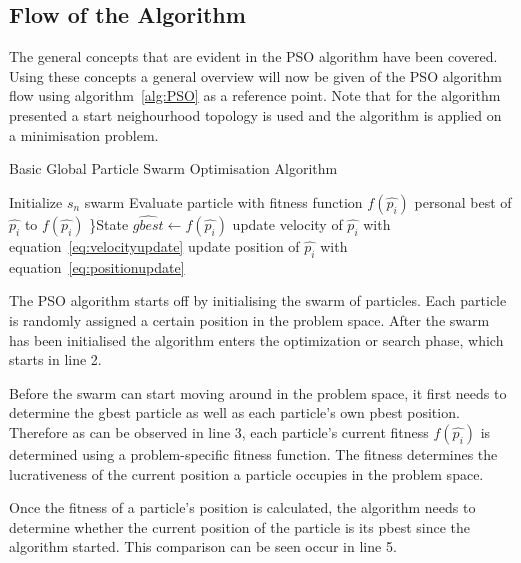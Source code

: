 \subsection{Flow of the Algorithm}
The general concepts that are evident in the \gls{PSO} algorithm have been covered. Using these concepts a general overview will now be given of the \gls{PSO} algorithm flow using algorithm~\ref{alg:PSO} as a reference point. Note that for the algorithm presented a start neighourhood topology is used and the algorithm is applied on a minimisation problem.
\begin{algorithm}[H]
\caption{Basic Global Particle Swarm Optimisation Algorithm\cite{CompuIntelligenceIntro}}
\label{alg:PSO}
	\begin{algorithmic}[1]
		\State Initialize $s_n$ swarm
				\State Evaluate particle with fitness function $f(\hat{p_i})$
					\State personal best of $\hat{p_i}$ to $f(\hat{p_i})$
				\EndIf
					\}State $\hat{gbest} \leftarrow f(\hat{p_i})$
				\EndIf
			\EndFor
				\State update velocity of $\hat{p_i}$ with equation~\ref{eq:velocityupdate}
				\State update position of $\hat{p_i}$ with equation~\ref{eq:positionupdate}
			\EndFor
		\EndWhile
	\end{algorithmic}
\end{algorithm}

The \gls{PSO} algorithm starts off by initialising the swarm of particles. Each particle is randomly assigned a certain position in the problem space. After the swarm has been initialised the algorithm enters the optimization or search phase, which starts in line 2.

Before the swarm can start moving around in the problem space, it first needs to determine the gbest particle as well as each particle's own pbest position. Therefore as can be observed in line 3, each particle's current fitness $f(\hat{p_i})$ is determined using a problem-specific fitness function. The fitness determines the lucrativeness of the current position a particle occupies in the problem space.

Once the fitness of a particle's position is calculated, the algorithm needs to determine whether the current position of the particle is its pbest since the algorithm started. This comparison can be seen occur in line 5. 

